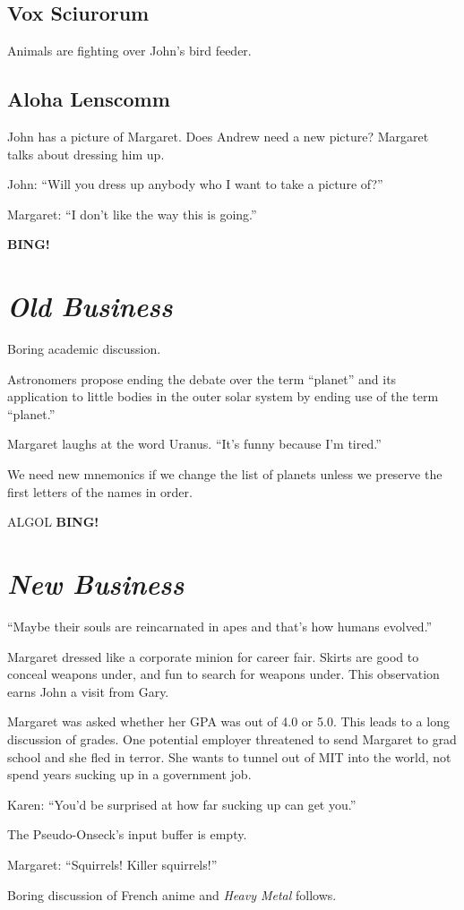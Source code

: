 \documentclass[10pt]{article}
\newcommand{\bing}{{\bf BING!} }
\newcommand{\goto}[1]{\bing \vskip 12pt \section*{{\em{#1}}}}
\begin{document}
\subsection*{Vox Sciurorum}

Animals are fighting over John's bird feeder.

\subsection*{Aloha Lenscomm}

John has a picture of Margaret.
Does Andrew need a new picture?  Margaret talks about dressing him up.

John: ``Will you dress up anybody who I want to take a picture of?''

Margaret: ``I don't like the way this is going.''

\goto{Old Business}

Boring academic discussion.

Astronomers propose ending the debate over the term ``planet'' and its
application to little bodies in the outer solar system by ending use
of the term ``planet.''

Margaret laughs at the word Uranus.  ``It's funny because I'm tired.''

We need new mnemonics if we change the list of planets unless we
preserve the first letters of the names in order.

ALGOL
\goto{New Business}

``Maybe their souls are reincarnated in apes and that's how humans evolved.''

Margaret dressed like a corporate minion for career fair.
Skirts are good to conceal weapons under, and fun to search
for weapons under.  This observation earns John a visit from
Gary.

Margaret was asked whether her GPA was out of 4.0 or 5.0.
This leads to a long discussion of grades.  One potential
employer threatened to send Margaret to grad school and
she fled in terror.  She wants to tunnel out of MIT into
the world, not spend years sucking up in a government job.

Karen: ``You'd be surprised at how far sucking up can get you.''

The Pseudo-Onseck's input buffer is empty.

Margaret: ``Squirrels!  Killer squirrels!''

Boring discussion of French anime and {\it Heavy Metal} follows.
\end{document}

